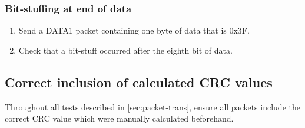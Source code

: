\documentclass{scrartcl}
\begin{document}
		\subsubsection{Bit-stuffing at end of data}
			\begin{enumerate}
            	\item Send a DATA1 packet containing one byte of data that is 0x3F.
                \item Check that a bit-stuff occurred after the eighth bit of data.
            \end{enumerate}
	
    \subsection{Correct inclusion of calculated CRC values}
		Throughout all tests described in \autoref{sec:packet-trans}, ensure all packets include the correct CRC value which were manually calculated beforehand.
\end{document}
